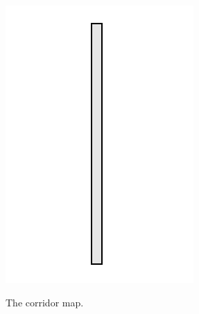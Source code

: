 \begin{figure}[hbtp]
\begin{subfigure}[t]{0.3\textwidth}
	\includegraphics[width=\linewidth]{Images/images/heatmaps/map_corridor.png}
	\label{fig:corridor_map}
	\caption{The corridor map.}
\end{subfigure}
~
\centering
\begin{subfigure}[t]{0.3\textwidth}

\end{subfigure}
\end{figure}
